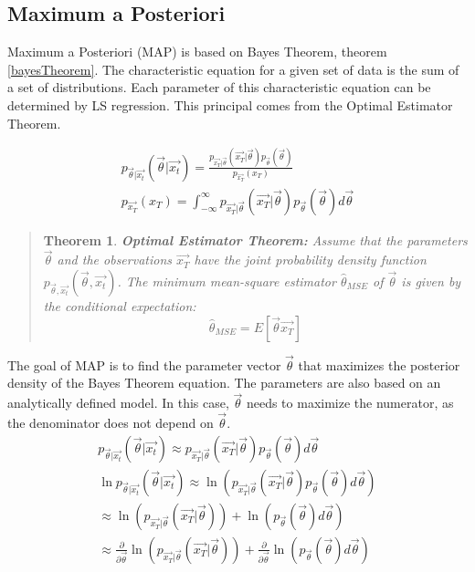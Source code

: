\documentclass[11pt]{article}
\newtheorem{thm}{Theorem}[section]
\begin{document}
\subsection{Maximum a Posteriori} 
Maximum a Posteriori (MAP) is based on Bayes Theorem, theorem \ref{bayesTheorem}.  The characteristic equation for a given set of data is the sum of a set of distributions.   Each parameter of this characteristic equation can be determined by LS regression.  This principal comes from the Optimal Estimator Theorem.  

\begin{eqnarray}
p_{\vec{\theta} | \vec{x_t}}(\vec{\theta} | \vec{x_t}) = \frac{p_{\vec{x_T} | \vec{\theta}}(\vec{x_T} | \vec{\theta}) p_{\vec{\theta}} (\vec{\theta})} { p_{\vec{x_T}} (x_T)  } \label{bayesTheorem}\\
p_{\vec{x_T}} (x_T)  = \int _{-\infty} ^{\infty} p_{\vec{x_T} | \vec{\theta}}(\vec{x_T} | \vec{\theta}) p_{\vec{\theta}} (\vec{\theta}) d\vec{\theta}
\end{eqnarray}


\begin{quote}
\begin{thm}
	\textbf{Optimal Estimator Theorem:} Assume that the parameters $\vec{\theta}$ and the observations $\vec{x_T}$ have the joint probability density function $p_{\vec{\theta} , \vec{x_t}}(\vec{\theta} , \vec{x_t})$.  The minimum mean-square estimator $\hat{\theta}_{MSE}$ of $\vec{\theta}$ is given by the conditional expectation:
\begin{equation}
\hat{\theta}_{MSE} = E[\vec{\theta} \vec{x_T}]
\end{equation}
\end{thm}
\cite[94]{appo-ica-book}
\end{quote}

The goal of MAP is to find the parameter vector $\vec{\theta}$ that maximizes the posterior density of the Bayes Theorem equation. The parameters are also based on an analytically defined model.  In this case,  $\vec{\theta}$ needs to maximize the numerator, as the denominator does not depend on $\vec{\theta}$.
\begin{eqnarray}
p_{\vec{\theta} | \vec{x_t}}(\vec{\theta} | \vec{x_t}) \approx p_{\vec{x_T} | \vec{\theta}}(\vec{x_T} | \vec{\theta}) p_{\vec{\theta}} (\vec{\theta}) d\vec{\theta} \\
\ln p_{\vec{\theta} | \vec{x_t}}(\vec{\theta} | \vec{x_t}) \approx \ln (p_{\vec{x_T} | \vec{\theta}}(\vec{x_T} | \vec{\theta}) p_{\vec{\theta}} (\vec{\theta}) d\vec{\theta}) \\
 \approx \ln( p_{\vec{x_T} | \vec{\theta}}(\vec{x_T} | \vec{\theta})) + \ln (p_{\vec{\theta}} (\vec{\theta}) d\vec{\theta} )\\
\approx 
\frac{\partial} {\partial \vec{\theta} } \ln( p_{\vec{x_T} | \vec{\theta}}(\vec{x_T} | \vec{\theta})) + \frac{\partial} {\partial \vec{\theta} } \ln (p_{\vec{\theta}} (\vec{\theta}) d\vec{\theta} ) \label{ln_bayes}
\end{eqnarray}
\end{document}
